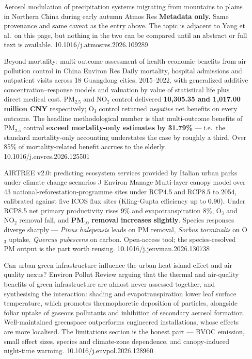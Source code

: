 \documentclass[10pt]{article}
\begin{document}
{Aerosol modulation of precipitation systems migrating from mountains to plains in Northern China during early autumn}
{Atmos Res}
{\textbf{Metadata only.} Same provenance and same caveat as the entry above. The topic
is adjacent to Yang et al.\ on this page, but nothing in the two can be compared until
an abstract or full text is available.}
{10.1016/j.atmosres.2026.109289}


{Beyond mortality: multi-outcome assessment of health economic benefits from air pollution control in China}
{Environ Res}
{Daily mortality, hospital admissions and outpatient visits across 18 Guangdong cities,
2015--2022, with generalized additive concentration--response models and valuation by
value of statistical life plus direct medical cost. PM$_{2.5}$ and NO$_2$ control
delivered \textbf{10{,}305.35 and 1{,}017.00 million CNY} respectively; O$_3$ control
returned \emph{negative} net benefits on every outcome. The headline methodological
number is that multi-outcome benefits of PM$_{2.5}$ control \textbf{exceed mortality-only
estimates by 31.79\%} --- i.e.\ the standard mortality-only accounting understates the
case by roughly a third. Over 85\% of mortality-related benefit accrues to the elderly.}
{10.1016/j.envres.2026.125501}

{AIRTREE v2.0: predicting ecosystem services provided by Italian urban parks under climate change scenarios}
{J Environ Manage}
{Multi-layer canopy model over 43 national-reforestation-programme sites under RCP4.5
and RCP8.5 to 2054, calibrated against five ICOS flux sites (Kling-Gupta efficiency up
to 0.90). Under RCP8.5 net primary productivity rises 9\% and evapotranspiration 8\%,
O$_3$ and NO$_2$ removal fall, and \textbf{PM$_{10}$ removal increases slightly}.
Species responses diverge sharply --- \textit{Pinus halepensis} leads on PM removal,
\textit{Sorbus torminalis} on O$_3$ uptake, \textit{Quercus pubescens} on carbon.
Open-access tool; the species-resolved PM output is the part worth reusing.}
{10.1016/j.jenvman.2026.130738}

{Can urban green infrastructure influence the urban heat island effect and air quality nexus?}
{Environ Pollut}
{Review arguing that the thermal and air-quality benefits of green infrastructure are
almost never assessed together, and synthesising the interaction: shading and
evapotranspiration lower leaf surface temperature, which promotes thermophoretic
deposition of particles, alongside foliar uptake of gaseous pollutants and inhibition of
secondary aerosol formation. Well-maintained greenspace outperforms engineered
installations, whose effects are more localised. The limitations section is the honest
part --- BVOC emission, small effect sizes, species and climate-zone dependence, and
canopy-induced night-time warming.}
{10.1016/j.envpol.2026.128960}
\end{document}
